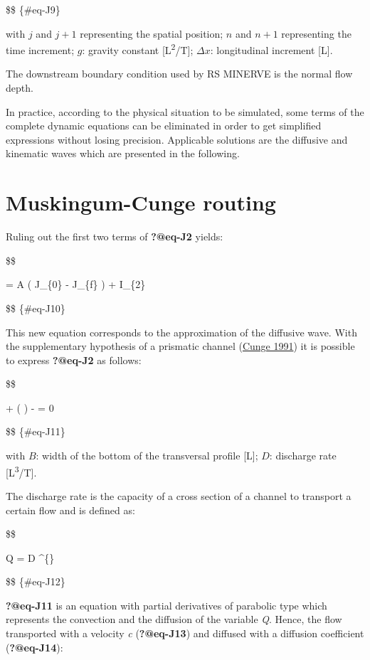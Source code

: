 \documentclass[
  letterpaper,
  DIV=11,
  numbers=noendperiod]{scrreprt}
\begin{document}
\$\$ \{\#eq-J9\}

with \(j\) and \(j+1\) representing the spatial position; \(n\) and
\(n+1\) representing the time increment; \(g\): gravity constant
{[}L\textsuperscript{2}/T{]}; \(\Delta x\): longitudinal increment
{[}L{]}.

The downstream boundary condition used by RS MINERVE is the normal flow
depth.

In practice, according to the physical situation to be simulated, some
terms of the complete dynamic equations can be eliminated in order to
get simplified expressions without losing precision. Applicable
solutions are the diffusive and kinematic waves which are presented in
the following.

\hypertarget{sec-model_channel_routing_muskingum}{%
\section{Muskingum-Cunge
routing}\label{sec-model_channel_routing_muskingum}}

Ruling out the first two terms of \textbf{?@eq-J2} yields:

\$\$

 = A \cdot \left( J\_\{0\} - J\_\{f\}
\right) + I\_\{2\}

\$\$ \{\#eq-J10\}

This new equation corresponds to the approximation of the diffusive
wave. With the supplementary hypothesis of a prismatic channel
(\protect\hyperlink{ref-cunge_polycopie_1991}{Cunge 1991}) it is
possible to express \textbf{?@eq-J2} as follows:

\$\$

 + \bigg(
 \bigg)
\cdot {} - 
\cdot {} = 0

\$\$ \{\#eq-J11\}

with \(B\): width of the bottom of the transversal profile {[}L{]};
\(D\): discharge rate {[}L\textsuperscript{3}/T{]}.

The discharge rate is the capacity of a cross section of a channel to
transport a certain flow and is defined as:

\$\$

Q = D \^{}\{\}

\$\$ \{\#eq-J12\}

\textbf{?@eq-J11} is an equation with partial derivatives of parabolic
type which represents the convection and the diffusion of the variable
\emph{Q}. Hence, the flow transported with a velocity \emph{c}
(\textbf{?@eq-J13}) and diffused with a diffusion coefficient
\delta (\textbf{?@eq-J14}):
\end{document}
